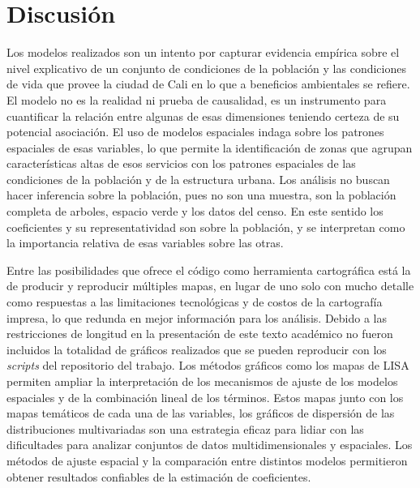 \documentclass[12pt,a4paper,openany]{book}
\theoremstyle{definition}
\theoremstyle{definition}
\theoremstyle{definition}
\theoremstyle{remark}
\begin{document}
\chapter{Discusión}\label{discusion}

Los modelos realizados son un intento por capturar evidencia empírica
sobre el nivel explicativo de un conjunto de condiciones de la población
y las condiciones de vida que provee la ciudad de Cali en lo que a
beneficios ambientales se refiere. El modelo no es la realidad ni prueba
de causalidad, es un instrumento para cuantificar la relación entre
algunas de esas dimensiones teniendo certeza de su potencial asociación.
El uso de modelos espaciales indaga sobre los patrones espaciales de
esas variables, lo que permite la identificación de zonas que agrupan
características altas de esos servicios con los patrones espaciales de
las condiciones de la población y de la estructura urbana. Los análisis
no buscan hacer inferencia sobre la población, pues no son una muestra,
son la población completa de arboles, espacio verde y los datos del
censo. En este sentido los coeficientes y su representatividad son sobre
la población, y se interpretan como la importancia relativa de esas
variables sobre las otras.

Entre las posibilidades que ofrece el código como herramienta
cartográfica está la de producir y reproducir múltiples mapas, en lugar
de uno solo con mucho detalle como respuestas a las limitaciones
tecnológicas y de costos de la cartografía impresa, lo que redunda en
mejor información para los análisis. Debido a las restricciones de
longitud en la presentación de este texto académico no fueron incluidos
la totalidad de gráficos realizados que se pueden reproducir con los
\emph{scripts} del repositorio del trabajo. Los métodos gráficos como
los mapas de LISA permiten ampliar la interpretación de los mecanismos
de ajuste de los modelos espaciales y de la combinación lineal de los
términos. Estos mapas junto con los mapas temáticos de cada una de las
variables, los gráficos de dispersión de las distribuciones
multivariadas son una estrategia eficaz para lidiar con las dificultades
para analizar conjuntos de datos multidimensionales y espaciales. Los
métodos de ajuste espacial y la comparación entre distintos modelos
permitieron obtener resultados confiables de la estimación de
coeficientes.
\end{document}
